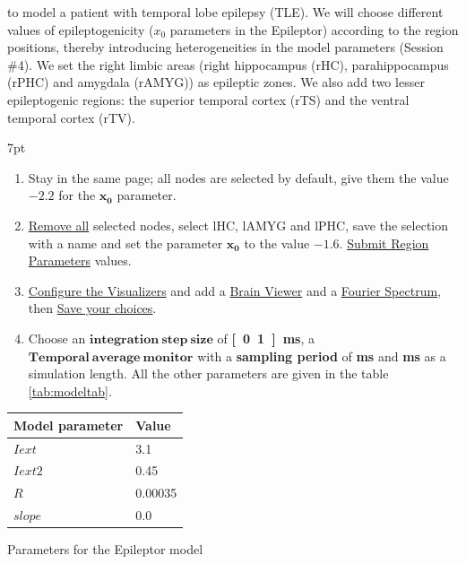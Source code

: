 \documentclass{tufte-handout}
\newenvironment{simulation}{%
  \def\FrameCommand{%
    \hspace{1pt}%
    {\color{ForestGreen}\vrule width 2pt}%
    {\color{simulationshade}\vrule width 4pt}%
    \colorbox{simulationshade}%
  }%
  \MakeFramed{\advance\hsize-\width\FrameRestore}%
  \noindent\hspace{-4.55pt}%
  \begin{adjustwidth}{}{7pt}%
  \vspace{2pt}\vspace{2pt}%
}
{%
  \vspace{2pt}\end{adjustwidth}\endMakeFramed%
}
\begin{document}
 to model a patient with temporal lobe epilepsy (TLE). We will choose different values of
epileptogenicity ($x_0$ parameters in the Epileptor) according to the region positions, thereby introducing heterogeneities in
the model parameters (Session \#4). We set the right limbic areas 
(right hippocampus (rHC), parahippocampus (rPHC) and amygdala (rAMYG)) as epileptic zones. We also add two lesser epileptogenic regions: 
the superior temporal cortex (rTS) and the ventral temporal cortex (rTV).

\begin{simulation}
  \begin{enumerate}
  \item Stay in the same page; all nodes are selected by default, give them the value $\mathbf{-2.2}$ for the $\mathbf{x_0}$ parameter.
  \item \underline{Remove all} selected nodes, select lHC, lAMYG and lPHC, save the selection with a name
	and set the parameter $\mathbf{x_0}$ to the value $\mathbf{-1.6}$. \underline{Submit Region Parameters} values.
  \item \underline{Configure the Visualizers} and add a \underline{Brain Viewer} and a \underline{Fourier Spectrum}, 
  then \underline{Save your choices}.
  \item Choose an $\mathbf{integration\:step\:size}$ of \textbf{\unit[0.1]{ms}}, a $\mathbf{Temporal\:average\:monitor}$ with a \textbf{sampling period} of \textbf{\unit[1]{ms}} and \textbf{\unit[6000]{ms}} as a simulation length. 
  All the other parameters are
  given in the table \ref{tab:modeltab}.
 \end{enumerate}
\end{simulation}

\begin{margintable}
  \centering
  \selectfont
  \begin{tabular}{ll}
    \toprule
    Model parameter & Value \\
    \midrule
             $Iext$          &   3.1  \\
             $Iext2$          &  0.45   \\
             $R$           &   0.00035        \\
             $slope$           &   0.0   \\
    \bottomrule
  \end{tabular}
  \caption{Parameters for the Epileptor model	 }
  \label{tab:modeltab}
\end{margintable}
\end{document}
